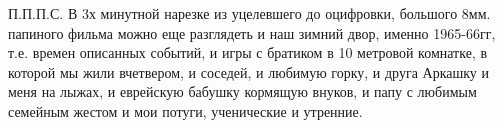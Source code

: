 П.П.П.С. В 3х минутной нарезке из уцелевшего до оцифровки, большого 8мм.
папиного фильма можно еще  разглядеть и наш зимний двор, именно 1965-66гг, т.е.
времен описанных событий, и игры с братиком в 10 метровой комнатке, в которой
мы жили вчетвером, и соседей, и любимую горку, и друга Аркашку и меня на лыжах,
и еврейскую бабушку кормящую внуков, и папу с  любимым семейным жестом и мои
потуги,  ученические и утренние.

